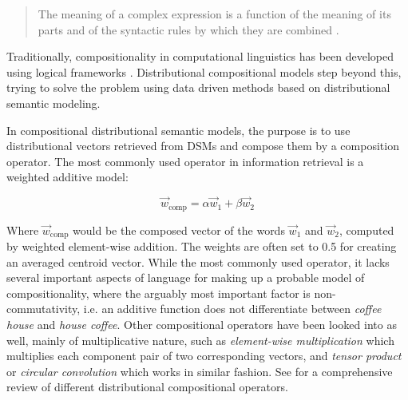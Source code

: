 \begin{quote}
The meaning of a complex expression is a function of the meaning of its parts and of the syntactic rules by which they are combined \parencite{Partee1990Mathematical}.
\end{quote}

Traditionally, compositionality in computational linguistics has been developed using logical frameworks \parencite{Kartsaklis2014Compositional}. Distributional compositional models step beyond this, trying to solve the problem using data driven methods based on distributional semantic modeling.

In compositional distributional semantic models, the purpose is to use distributional vectors retrieved from DSMs and compose them by a composition operator. The most commonly used operator in information retrieval is a weighted additive model:

\begin{equation}\vec{w}_{\text{comp}} = \alpha \vec{w}_1 + \beta \vec{w}_2\end{equation}

Where $\vec{w}_{\text{comp}}$ would be the composed vector of the words $\vec{w}_1$ and $\vec{w}_2$, computed by weighted element-wise addition. The weights are often set to 0.5 for creating an averaged centroid vector. While the most commonly used operator, it lacks several important aspects of language for making up a probable model of compositionality, where the arguably most important factor is non-commutativity, i.e. an additive function does not differentiate between \emph{coffee house} and \emph{house coffee}. Other compositional operators have been looked into as well, mainly of multiplicative nature, such as \emph{element-wise multiplication} which multiplies each component pair of two corresponding vectors, and \emph{tensor product} or \emph{circular convolution} which works in similar fashion. See \textcite{Kartsaklis2014Compositional} for a comprehensive review of different distributional compositional operators.
